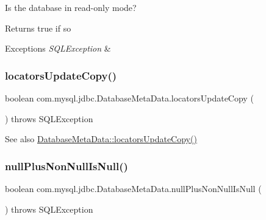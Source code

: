 Is the database in read-\/only mode?

\begin{DoxyReturn}{Returns}
true if so 
\end{DoxyReturn}

\begin{DoxyExceptions}{Exceptions}
{\em S\+Q\+L\+Exception} & \\
\hline
\end{DoxyExceptions}
\mbox{\label{classcom_1_1mysql_1_1jdbc_1_1_database_meta_data_a5c029c7d3dd2664252ebeaf73f501631}} 
\subsubsection{\texorpdfstring{locators\+Update\+Copy()}{locatorsUpdateCopy()}}
{\footnotesize\ttfamily boolean com.\+mysql.\+jdbc.\+Database\+Meta\+Data.\+locators\+Update\+Copy (\begin{DoxyParamCaption}{ }\end{DoxyParamCaption}) throws S\+Q\+L\+Exception}

\begin{DoxySeeAlso}{See also}
\mbox{\hyperlink{classcom_1_1mysql_1_1jdbc_1_1_database_meta_data_a5c029c7d3dd2664252ebeaf73f501631}{Database\+Meta\+Data\+::locators\+Update\+Copy()}} 
\end{DoxySeeAlso}
\mbox{\label{classcom_1_1mysql_1_1jdbc_1_1_database_meta_data_af460ce240d8528baddb59ac0d001d574}} 
\subsubsection{\texorpdfstring{null\+Plus\+Non\+Null\+Is\+Null()}{nullPlusNonNullIsNull()}}
{\footnotesize\ttfamily boolean com.\+mysql.\+jdbc.\+Database\+Meta\+Data.\+null\+Plus\+Non\+Null\+Is\+Null (\begin{DoxyParamCaption}{ }\end{DoxyParamCaption}) throws S\+Q\+L\+Exception}

